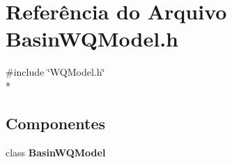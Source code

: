 \section{Referência do Arquivo Basin\+W\+Q\+Model.\+h}
\label{_basin_w_q_model_8h}
{\ttfamily \#include \char`\"{}W\+Q\+Model.\+h\char`\"{}}\\*
\subsection*{Componentes}
\begin{DoxyCompactItemize}
\item 
class {\bf Basin\+W\+Q\+Model}
\end{DoxyCompactItemize}
